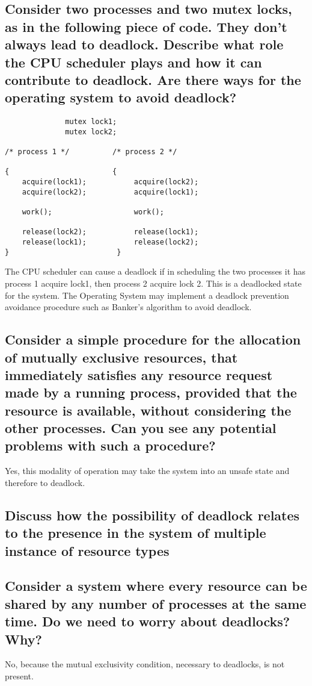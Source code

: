 \documentclass{article}
\begin{document}
\subsection{Consider two processes and two mutex locks, as in the following piece of code. They don't always lead to deadlock. Describe what role the CPU scheduler plays and how it can contribute to deadlock. Are there ways for the operating system to avoid deadlock?}
\begin{verbatim}
              mutex lock1;
              mutex lock2;

/* process 1 */          /* process 2 */

{                        {
    acquire(lock1);           acquire(lock2);
    acquire(lock2);           acquire(lock1);

    work();                   work();

    release(lock2);           release(lock1);
    release(lock1);           release(lock2);
}                         }
\end{verbatim}

The CPU scheduler can cause a deadlock if in scheduling the two processes it has process 1 acquire lock1, then process 2 acquire lock 2. This is a deadlocked state for the system. The Operating System may implement a deadlock prevention avoidance procedure such as Banker's algorithm to avoid deadlock.

\subsection{Consider a simple procedure for the allocation of mutually exclusive resources, that immediately satisfies any resource request made by a running process, provided that the resource is available, without considering the other processes. Can you see any potential problems with such a  procedure?}
Yes, this modality of operation may take the system into an unsafe state and therefore to deadlock.

\subsection{Discuss how the possibility of deadlock relates to the presence in the system of multiple instance of resource types}

\subsection{Consider a system where every resource can be shared by any number of processes at the same time. Do we need to worry about deadlocks? Why?}
No, because the mutual exclusivity condition, necessary to deadlocks, is not present.
\end{document}
